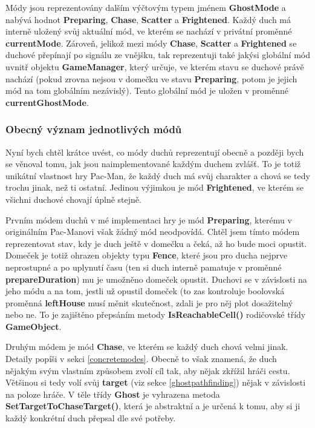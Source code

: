 \documentclass[a4]{article}
\begin{document}
Módy jsou reprezentovány dalším výčtovým typem jménem \textbf{GhostMode} a nabývá hodnot \textbf{Preparing}, \textbf{Chase}, \textbf{Scatter} a \textbf{Frightened}. Každý duch má interně uložený svůj aktuální mód, ve kterém se nachází v privátní proměnné \textbf{currentMode}. Zároveň, jelikož mezi módy \textbf{Chase}, \textbf{Scatter} a \textbf{Frightened} se duchové přepínají po signálu ze vnějšku, tak reprezentuji také jakýsi globální mód uvnitř objektu \textbf{GameManager}, který určuje, ve kterém stavu se duchové právě nachází (pokud zrovna nejsou v domečku ve stavu \textbf{Preparing}, potom je jejich mód na tom globálním nezávislý). Tento globální mód je uložen v proměnné \textbf{currentGhostMode}.
\subsubsection{Obecný význam jednotlivých módů} \label{modemeaning}
Nyní bych chtěl krátce uvést, co módy duchů reprezentují obecně a později bych se věnoval tomu, jak jsou naimplementované každým duchem zvlášť. To je totiž unikátní vlastnost hry Pac-Man, že každý duch má svůj charakter a chová se tedy trochu jinak, než ti ostatní. Jedinou výjimkou je mód \textbf{Frightened}, ve kterém se všichni duchové chovají úplně stejně.

Prvním módem duchů v mé implementaci hry je mód \textbf{Preparing}, kterému v originálním Pac-Manovi však žádný mód neodpovídá. Chtěl jsem tímto módem reprezentovat stav, kdy je duch ještě v domečku a čeká, až ho bude moci opustit. Domeček je totiž ohrazen objekty typu \textbf{Fence}, které jsou pro ducha nejprve neprostupné a po uplynutí času (ten si duch interně pamatuje v proměnné \textbf{prepareDuration}) mu je umožněno domeček opustit. Duchovi se v závislosti na jeho módu a na tom, jestli už opustil domeček (to zas kontroluje boolovská proměnná \textbf{leftHouse} musí měnit skutečnost, zdali je pro něj plot dosažitelný nebo ne. To je zajištěno přepsáním metody \textbf{IsReachableCell()} rodičovské třídy \textbf{GameObject}.

Druhým módem je mód \textbf{Chase}, ve kterém se každý duch chová velmi jinak. Detaily popíši v sekci \ref{concretemodes}. Obecně to však znamená, že duch nějakým svým vlastním způsobem zvolí cíl tak, aby nějak zkřížil hráči cestu. Většinou si tedy volí svůj \textbf{target} (viz sekce \ref{ghostpathfinding}) nějak v závislosti na poloze hráče. V těle třídy \textbf{Ghost} je vyhrazena metoda \textbf{SetTargetToChaseTarget()}, která je abstraktní a je určená k tomu, aby si ji každý konkrétní duch přepsal dle své potřeby.
\end{document}
